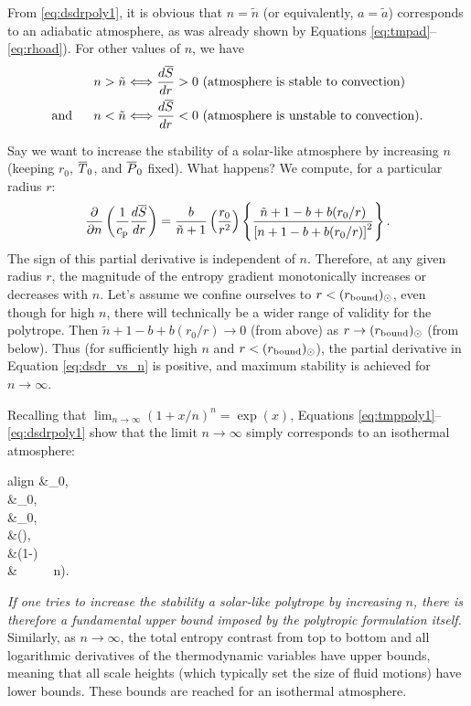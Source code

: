 \documentclass[12pt]{article} %
\newcommand{\rbound}{r_{\rm{bound}}}
\begin{document}
From \eqref{eq:dsdrpoly1}, it is obvious that $n=\tilde{n}$ (or equivalently, $a=\tilde{a}$) corresponds to an adiabatic atmosphere, as was already shown by Equations \eqref{eq:tmpad}--\eqref{eq:rhoad}). For other values of $n$, we have
\begin{align}
&n > \tilde{n} \Longleftrightarrow \frac{d\overline{S}}{dr} > 0 \text{ (atmosphere is stable to convection)}\\
\text{and}\ \ \ \ \  &n < \tilde{n} \Longleftrightarrow \frac{d\overline{S}}{dr} < 0 \text{ (atmosphere is unstable to convection).}
\end{align}

Say we want to increase the stability of a solar-like atmosphere by increasing $n$ (keeping $r_0$, $\overline{T}_0$, and $\overline{P}_0$ fixed). What happens? We compute, for a particular radius $r$:
\begin{align}\label{eq:dsdr_vs_n}
	\frac{\partial}{\partial n}\left(\frac{1}{c_{\rm{p}}}\frac{d\overline{S}}{dr}\right)=  \frac{b}{\tilde{n}+1}\left(\frac{r_0}{r^2}\right)  \left\{\frac{\tilde{n}+1-b+b(r_0/r)}{\left[n+1-b+b(r_0/r)\right]^2}\right\}. 
\end{align}
The sign of this partial derivative is independent of $n$. Therefore, at any given radius $r$, the magnitude of the entropy gradient monotonically increases or decreases with $n$. Let's assume we confine ourselves to $r<(\rbound)_\odot$, even though for high $n$, there will technically be a wider range of validity for the polytrope. Then $\tilde{n}+1-b+b(r_0/r)\rightarrow0$ (from above) as $r\rightarrow(\rbound)_\odot$ (from below). Thus (for sufficiently high $n$ and $r<(\rbound)_\odot$), the partial derivative in Equation \eqref{eq:dsdr_vs_n} is positive, and maximum stability is achieved for $n\rightarrow\infty$. 

Recalling that $\lim_{n\rightarrow\infty}(1+x/n)^n=\exp(x)$, Equations \eqref{eq:tmppoly1}--\eqref{eq:dsdrpoly1} show that the limit $n\rightarrow\infty$ simply corresponds to an isothermal atmosphere:
	\begin{empheq}[box=\fbox]{align}\label{eq:limitninfty}
\tmpref\ofr&\rightarrow \tmpref_0, \\
\prsref\ofr&\rightarrow \prsref_0,\\
\rhoref\ofr&\rightarrow \rhoref_0,\\
\dsdr &\rightarrow {}\left(\right),\\
 \andd \frac{\sref\ofr}{\cp} &\rightarrow {}\left(1-\right)\\ 
 &\ \ \ \ \  n\rightarrow\infty). \nonumber
\end{empheq}
\textit{If one tries to increase the stability a solar-like polytrope by increasing $n$, there is therefore a fundamental upper bound imposed by the polytropic formulation itself.}
Similarly, as $n\rightarrow\infty$, the total entropy contrast from top to bottom and all logarithmic derivatives of the thermodynamic variables have upper bounds, meaning that all scale heights (which typically set the size of fluid motions) have lower bounds. These bounds are reached for an isothermal atmosphere.
\end{document}
